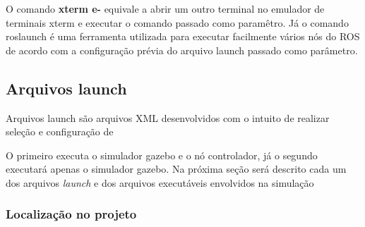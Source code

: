 O comando \textbf{xterm e-} equivale a abrir um outro terminal no emulador de terminais xterm e executar o comando passado como paramêtro. Já o comando roslaunch é uma ferramenta utilizada para executar facilmente vários nós do ROS de acordo com a configuração prévia do arquivo launch passado como parâmetro. 

\subsection{Arquivos launch}

Arquivos launch são arquivos XML desenvolvidos com o intuito de realizar seleção e configuração de 

O primeiro executa o simulador gazebo e o nó controlador, já o segundo executará apenas o simulador gazebo. Na próxima seção será descrito cada um dos arquivos \textit{launch} e dos arquivos executáveis envolvidos na simulação 

\subsubsection{Localização no projeto}

